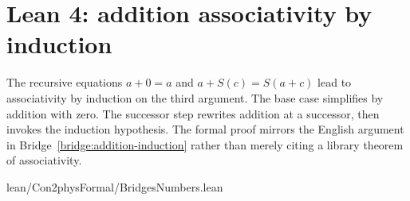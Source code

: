 \section{Lean 4: addition associativity by induction}
\label{sec:lean-bridge-09}
The recursive equations $a+0=a$ and $a+S(c)=S(a+c)$ lead to
associativity by induction on the third argument. The base case
simplifies by addition with zero. The successor step rewrites
addition at a successor, then invokes the induction hypothesis.
The formal proof mirrors the English argument in
Bridge~\ref{bridge:addition-induction} rather than merely citing
a library theorem of associativity.


{lean/Con2physFormal/BridgesNumbers.lean}
